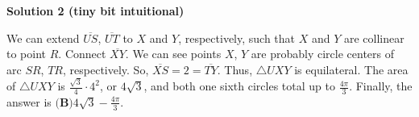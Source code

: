 \begin{enumerate}
\textbf{Solution 2 (tiny bit intuitional)}

We can extend $\overline{US}$, $\overline{UT}$ to $X$ and $Y$, respectively, such that $X$ and $Y$ are collinear to point $R$. Connect $\overline{XY}$. We can see points $X$, $Y$ are probably circle centers of arc $SR$, $TR$, respectively. So, $\overline{XS} = 2 = \overline{TY}$. Thus, $\triangle{UXY}$ is equilateral. The area of $\triangle{UXY}$ is $\frac{\sqrt{3}}{4} \cdot 4^2$, or $4\sqrt{3}$, and both one sixth circles total up to $\frac{4\pi}{3}$. Finally, the answer is $\boxed{\textbf{(B)} 4\sqrt{3}-\frac{4\pi}{3}}$.

 


\end{enumerate}